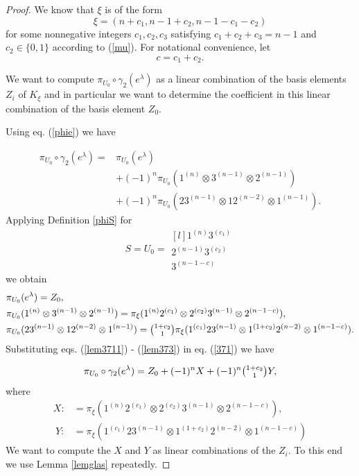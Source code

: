 \documentclass[11pt]{amsart}
\theoremstyle{definition}
\numberwithin{equation}{section}
\begin{document}
\begin{proof}
	We know that $\xi$ is of the form \[\xi=(n+c_1, n-1+c_2, n-1-c_1-c_2)\] for some nonnegative integers $c_1, c_2, c_3$ satisfying $c_1 +c_2 +c_3 = n-1$ and $c_2 \in \{0,1\}$ according to (\ref{mu}). For notational convenience, let \[c=c_1+c_2.\]
	
	We want to  compute $\pi_{U_0} \circ \gamma_2 (e^\lambda)$ as a linear combination of the basis elements $Z_i$ of $K_\xi$ and in particular we want to determine the coefficient in this linear combination of the basis element $Z_0$.
	
	Using eq. (\ref{phie}) we have
	
	\begin{align}\label{371}
		\pi_{U_0}\circ \gamma_2(e^{\lambda})= &\pi_{U_0}(e^{\lambda}) \\\nonumber&+(-1)^{n}\pi_{U_0}(1^{(n)} \otimes 3^{(n-1)} \otimes 2^{(n-1)})\\\nonumber&  +    (-1)^n\pi_{U_0}(23^{(n-1)} \otimes 12^{(n-2)} \otimes 1^{(n-1)}).
	\end{align}
	Applying Definition \ref{phiS} for \begin{equation*} S=U_0=\begin{matrix*}[l]
			1^{(n)}3^{(c_1)} \\
			2^{(n-1)}3^{(c_2)} \\
			3^{(n-1-c)} \end{matrix*}\end{equation*} we obtain  
		\begin{align}
		&\label{lem3711}\pi_{U_0}(e^{\lambda})=Z_0,\\\label{lem372} &\pi_{U_0}(1^{(n)} \otimes 3^{(n-1)} \otimes 2^{(n-1)})=\pi_\xi(1^{(n)}2^{(c_1)} \otimes 2^{(c_2)}3^{(n-1)} \otimes 2^{(n-1-c)}),\\ &\label{lem373}\pi_{U_0}(23^{(n-1)} \otimes 12^{(n-2)} \otimes 1^{(n-1)})=\tbinom{1+c_2}{1}\pi_\xi(1^{(c_1)}23^{(n-1)} \otimes 1^{(1+c_2)}2^{(n-2)} \otimes 1^{(n-1-c)}).
	\end{align}
	Substituting eqs. (\ref{lem3711}) - (\ref{lem373}) in eq. (\ref{371}) we have 
	
	\begin{align}\label{371*}
		\pi_{U_0}\circ \gamma_2(e^{\lambda})= Z_0 + (-1)^{n}X +(-1)^{n}\tbinom{1+c_2}{1}Y,
	\end{align}
	where 
	\begin{align*} X:&=\pi_\xi(1^{(n)}2^{(c_1)} \otimes 2^{(c_2)}3^{(n-1)} \otimes 2^{(n-1-c)}), \\\
		Y:&=\pi_\xi(1^{(c_1)}23^{(n-1)} \otimes 1^{(1+c_2)}2^{(n-2)} \otimes 1^{(n-1-c)})
		\end{align*}
We want to compute the $X$ and $Y$ as linear combinations of the $Z_i$. To this end we use Lemma \ref{lemglas} repeatedly. 


\end{proof}
\end{document}

